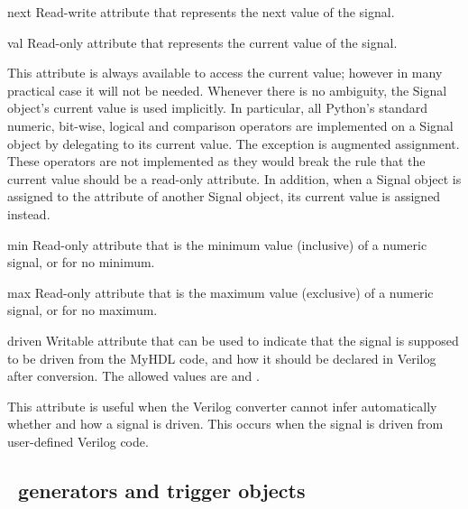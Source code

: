 \begin{memberdesc}[Signal]{next}
Read-write attribute that represents the next value of the signal.
\end{memberdesc}

\begin{memberdesc}[Signal]{val}
Read-only attribute that represents the current value of the signal.

This attribute is always available to access the current value;
however in many practical case it will not be needed. Whenever there
is no ambiguity, the Signal object's current value is used
implicitly. In particular, all Python's standard numeric, bit-wise,
logical and comparison operators are implemented on a Signal object by
delegating to its current value. The exception is augmented
assignment. These operators are not implemented as they would break
the rule that the current value should be a read-only attribute. In
addition, when a Signal object is assigned to the 
attribute of another Signal object, its current value is assigned
instead.
\end{memberdesc}

\begin{memberdesc}[Signal]{min}
Read-only attribute that is the minimum value (inclusive) of a
numeric signal, or  for no minimum.
\end{memberdesc}
\begin{memberdesc}[Signal]{max}
Read-only attribute that is the maximum value
(exclusive) of a numeric signal, or  for no 
maximum.
\end{memberdesc}

\begin{memberdesc}[Signal]{driven}
Writable attribute that can be used to indicate that the signal
is supposed to be driven from the MyHDL code, and how it should
be declared in Verilog after conversion. The allowed values
are  and .

This attribute is useful when the Verilog converter cannot
infer automatically whether and how a signal is driven. This
occurs when the signal is driven from user-defined Verilog code.
\end{memberdesc}




\subsection{\myhdl\ generators and trigger objects \label{ref-gen}}

